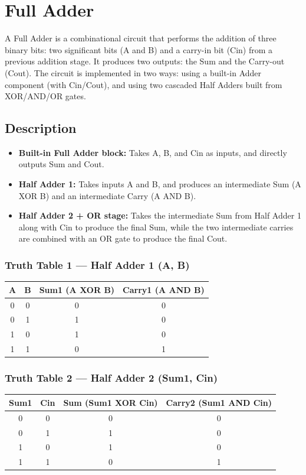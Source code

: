 \documentclass[12pt]{article}
\begin{document}
\newpage

\section{Full Adder}

A Full Adder is a combinational circuit that performs the addition of three binary bits: two significant bits (A and B) and a carry-in bit (Cin) from a previous addition stage. It produces two outputs: the Sum and the Carry-out (Cout). The circuit is implemented in two ways: using a built-in Adder component (with Cin/Cout), and using two cascaded Half Adders built from XOR/AND/OR gates.

\subsection*{Description}
\begin{itemize}[leftmargin=*]
    \item \textbf{Built-in Full Adder block:} Takes A, B, and Cin as inputs, and directly outputs Sum and Cout.
    \item \textbf{Half Adder 1:} Takes inputs A and B, and produces an intermediate Sum (A XOR B) and an intermediate Carry (A AND B).
    \item \textbf{Half Adder 2 + OR stage:} Takes the intermediate Sum from Half Adder 1 along with Cin to produce the final Sum, while the two intermediate carries are combined with an OR gate to produce the final Cout.
\end{itemize}

\subsubsection*{Truth Table 1 --- Half Adder 1 (A, B)}
\begin{table}[H]
\centering
\begin{tabular}{cccc}
\toprule
A & B & Sum1 (A XOR B) & Carry1 (A AND B) \\
\midrule
0 & 0 & 0 & 0 \\
0 & 1 & 1 & 0 \\
1 & 0 & 1 & 0 \\
1 & 1 & 0 & 1 \\
\bottomrule
\end{tabular}
\end{table}

\subsubsection*{Truth Table 2 --- Half Adder 2 (Sum1, Cin)}
\begin{table}[H]
\centering
\begin{tabular}{cccc}
\toprule
Sum1 & Cin & Sum (Sum1 XOR Cin) & Carry2 (Sum1 AND Cin) \\
\midrule
0 & 0 & 0 & 0 \\
0 & 1 & 1 & 0 \\
1 & 0 & 1 & 0 \\
1 & 1 & 0 & 1 \\
\bottomrule
\end{tabular}
\end{table}
\end{document}
